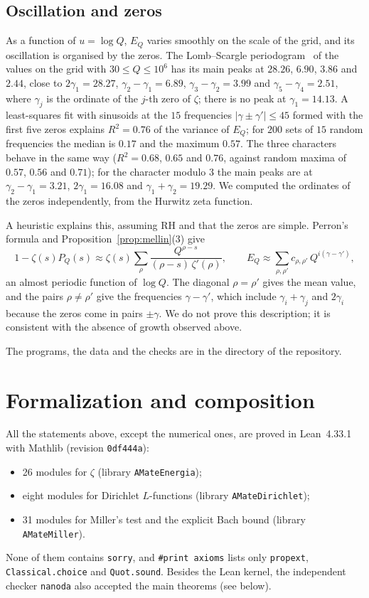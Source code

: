 \documentclass[11pt,a4paper]{amsart}
\theoremstyle{definition}
\theoremstyle{remark}
\begin{document}
\subsection*{Oscillation and zeros}
As a function of $u=\log Q$, $E_Q$ varies smoothly on the scale of the grid, and its oscillation is organised by the zeros. The Lomb--Scargle periodogram~\cite{Lomb,Scargle} of the values on the grid with $30\le Q\le10^6$ has its main peaks at $28.26$, $6.90$, $3.86$ and $2.44$, close to $2\gamma_1=28.27$, $\gamma_2-\gamma_1=6.89$, $\gamma_3-\gamma_2=3.99$ and $\gamma_5-\gamma_4=2.51$, where $\gamma_j$ is the ordinate of the $j$-th zero of $\zeta$; there is no peak at $\gamma_1=14.13$. A least-squares fit with sinusoids at the $15$ frequencies $|\gamma\pm\gamma'|\le45$ formed with the first five zeros explains $R^2=0.76$ of the variance of $E_Q$; for $200$ sets of $15$ random frequencies the median is $0.17$ and the maximum $0.57$. The three characters behave in the same way ($R^2=0.68$, $0.65$ and $0.76$, against random maxima of $0.57$, $0.56$ and $0.71$); for the character modulo $3$ the main peaks are at $\gamma_2-\gamma_1=3.21$, $2\gamma_1=16.08$ and $\gamma_1+\gamma_2=19.29$. We computed the ordinates of the zeros independently, from the Hurwitz zeta function.

A heuristic explains this, assuming RH and that the zeros are simple. Perron's formula and Proposition~\ref{prop:mellin}(3) give
\[
1-\zeta(s)P_Q(s)\approx\zeta(s)\sum_\rho\frac{Q^{\rho-s}}{(\rho-s)\,\zeta'(\rho)},\qquad
E_Q\approx\sum_{\rho,\rho'}c_{\rho,\rho'}\,Q^{i(\gamma-\gamma')},
\]
an almost periodic function of $\log Q$. The diagonal $\rho=\rho'$ gives the mean value, and the pairs $\rho\ne\rho'$ give the frequencies $\gamma-\gamma'$, which include $\gamma_i+\gamma_j$ and $2\gamma_i$ because the zeros come in pairs $\pm\gamma$. We do not prove this description; it is consistent with the absence of growth observed above.

The programs, the data and the checks are in the directory  of the repository.

\section{Formalization and composition}\label{sec:formal}

All the statements above, except the numerical ones, are proved in Lean~4.33.1 with Mathlib (revision \texttt{0df444a}):
\begin{itemize}
\item 26 modules for $\zeta$ (library \texttt{AMateEnergia});
\item eight modules for Dirichlet $L$-functions (library \texttt{AMateDirichlet});
\item 31 modules for Miller's test and the explicit Bach bound (library \texttt{AMateMiller}).
\end{itemize}
None of them contains \texttt{sorry}, and \texttt{\#print axioms} lists only \texttt{propext}, \texttt{Classical.choice} and \texttt{Quot.sound}. Besides the Lean kernel, the independent checker \texttt{nanoda} also accepted the main theorems (see below).
\end{document}
